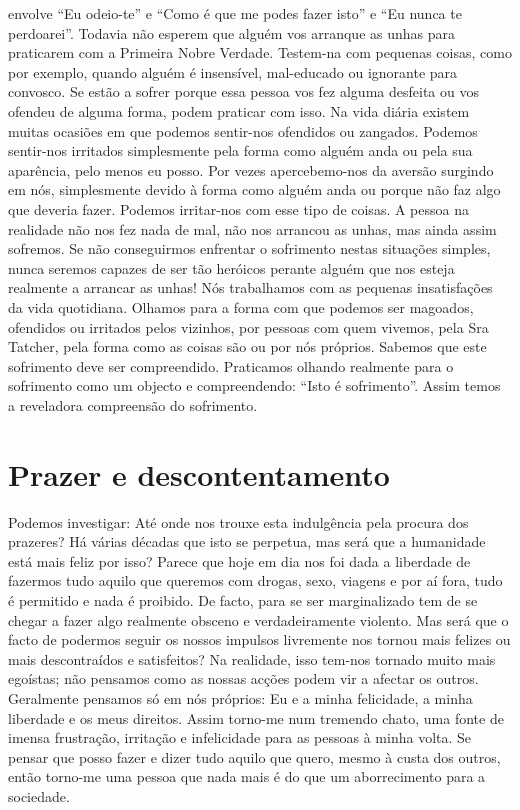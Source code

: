 envolve “Eu odeio-te” e “Como é que me podes fazer isto” e
“Eu nunca te perdoarei”.
Todavia não esperem que alguém vos arranque as unhas
para praticarem com a Primeira Nobre Verdade. Testem-na
com pequenas coisas, como por exemplo, quando alguém é
insensível, mal-educado ou ignorante para convosco. Se estão
a sofrer porque essa pessoa vos fez alguma desfeita ou vos
ofendeu de alguma forma, podem praticar com isso. Na vida
diária existem muitas ocasiões em que podemos sentir-nos
ofendidos ou zangados. Podemos sentir-nos irritados simplesmente pela forma como alguém anda ou pela sua aparência,
pelo menos eu posso. Por vezes apercebemo-nos da aversão
surgindo em nós, simplesmente devido à forma como alguém
anda ou porque não faz algo que deveria fazer. Podemos irritar-nos com esse tipo de coisas. A pessoa na realidade não nos
fez nada de mal, não nos arrancou as unhas, mas ainda assim
sofremos. Se não conseguirmos enfrentar o sofrimento nestas
situações simples, nunca seremos capazes de ser tão heróicos
perante alguém que nos esteja realmente a arrancar as unhas!
Nós trabalhamos com as pequenas insatisfações da vida
quotidiana. Olhamos para a forma com que podemos ser
magoados, ofendidos ou irritados pelos vizinhos, por pessoas
com quem vivemos, pela Sra Tatcher, pela forma como as
coisas são ou por nós próprios. Sabemos que este sofrimento
deve ser compreendido. Praticamos olhando realmente para o
sofrimento como um objecto e compreendendo: “Isto é sofrimento”. Assim temos a reveladora compreensão do sofrimento.

\section{Prazer e descontentamento}

Podemos investigar: Até onde nos trouxe esta indulgência
pela procura dos prazeres? Há várias décadas que isto se
perpetua, mas será que a humanidade está mais feliz por isso?
Parece que hoje em dia nos foi dada a liberdade de fazermos
tudo aquilo que queremos com drogas, sexo, viagens e por aí
fora, tudo é permitido e nada é proibido. De facto, para se ser
marginalizado tem de se chegar a fazer algo realmente
obsceno e verdadeiramente violento. Mas será que o facto de
podermos seguir os nossos impulsos livremente nos tornou
mais felizes ou mais descontraídos e satisfeitos? Na realidade,
isso tem-nos tornado muito mais egoístas; não pensamos
como as nossas acções podem vir a afectar os outros.
Geralmente pensamos só em nós próprios: Eu e a minha felicidade, a minha liberdade e os meus direitos. Assim torno-me
num tremendo chato, uma fonte de imensa frustração, irritação e infelicidade para as pessoas à minha volta. Se pensar
que posso fazer e dizer tudo aquilo que quero, mesmo à custa
dos outros, então torno-me uma pessoa que nada mais é do
que um aborrecimento para a sociedade.

